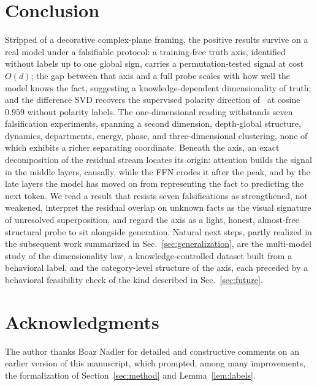 \documentclass[11pt]{article}
\begin{document}
\section{Conclusion}

Stripped of a decorative complex-plane framing, the positive results survive
on a real model under a falsifiable protocol: a training-free truth axis,
identified without labels up to one global sign, carries a permutation-tested
signal at cost $O(d)$; the gap between that axis and a full probe scales with
how well the model knows the fact, suggesting a knowledge-dependent
dimensionality of truth; and the difference SVD recovers the supervised
polarity direction of~\cite{burger2024} at cosine $0.959$ without polarity
labels. The one-dimensional reading withstands seven falsification
experiments, spanning a second dimension, depth-global structure, dynamics,
departments, energy, phase, and three-dimensional clustering, none of which
exhibits a richer separating coordinate. Beneath the axis, an exact
decomposition of the residual stream locates its origin: attention builds the
signal in the middle layers, causally, while the FFN erodes it after the
peak, and by the late layers the model has moved on from representing the
fact to predicting the next token. We read a result that resists seven
falsifications as strengthened, not weakened, interpret the residual overlap
on unknown facts as the visual signature of unresolved superposition, and
regard the axis as a light, honest, almost-free structural probe to sit
alongside generation. Natural next steps, partly realized in the subsequent
work summarized in Sec.~\ref{sec:generalization}, are the multi-model study
of the dimensionality law, a knowledge-controlled dataset built from a
behavioral label, and the category-level structure of the axis, each preceded
by a behavioral feasibility check of the kind described in
Sec.~\ref{sec:future}.

\section*{Acknowledgments}

The author thanks Boaz Nadler for detailed and constructive comments on an
earlier version of this manuscript, which prompted, among many improvements,
the formalization of Section~\ref{sec:method} and Lemma~\ref{lem:labels}.
\end{document}
